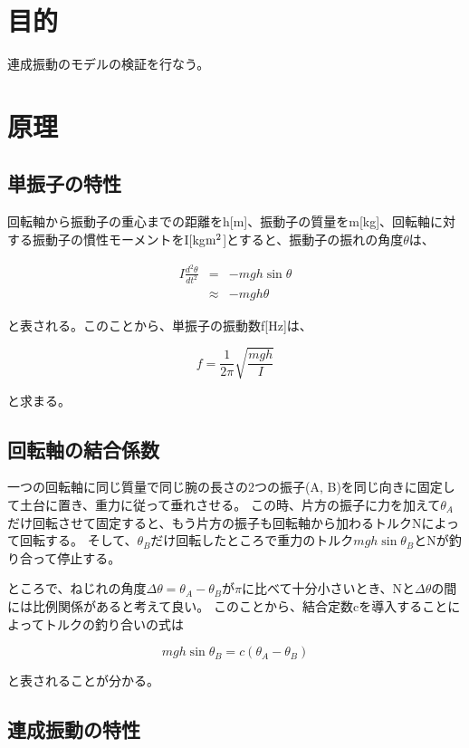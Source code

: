 \documentclass[uplatex,11pt]{jsarticle}
\begin{document}
\section{目的}

連成振動のモデルの検証を行なう。

\section{原理}

\subsection*{単振子の特性}

回転軸から振動子の重心までの距離をh[m]、振動子の質量をm[kg]、回転軸に対する振動子の慣性モーメントをI[kg${\rm m^2}$]とすると、振動子の振れの角度$\theta$は、

\begin{eqnarray*}
    I\frac{d^2\theta}{dt^2} & = & -mgh \sin \theta \\
                      & \approx & -mgh \theta
\end{eqnarray*}

と表される。このことから、単振子の振動数f[Hz]は、

\[
    f = \frac{1}{2\pi}\sqrt{\frac{mgh}{I}}
\]

と求まる。

\subsection*{回転軸の結合係数}

一つの回転軸に同じ質量で同じ腕の長さの2つの振子(A, B)を同じ向きに固定して土台に置き、重力に従って垂れさせる。
この時、片方の振子に力を加えて$\theta_A$だけ回転させて固定すると、もう片方の振子も回転軸から加わるトルクNによって回転する。
そして、$\theta_B$だけ回転したところで重力のトルク$mgh\sin\theta_B$とNが釣り合って停止する。

ところで、ねじれの角度$\Delta \theta = \theta_A - \theta_B$が$\pi$に比べて十分小さいとき、Nと$\Delta \theta$の間には比例関係があると考えて良い。
このことから、結合定数cを導入することによってトルクの釣り合いの式は

\[
    mgh\sin\theta_B = c(\theta_A - \theta_B)
\]

と表されることが分かる。

\subsection*{連成振動の特性}
\end{document}
